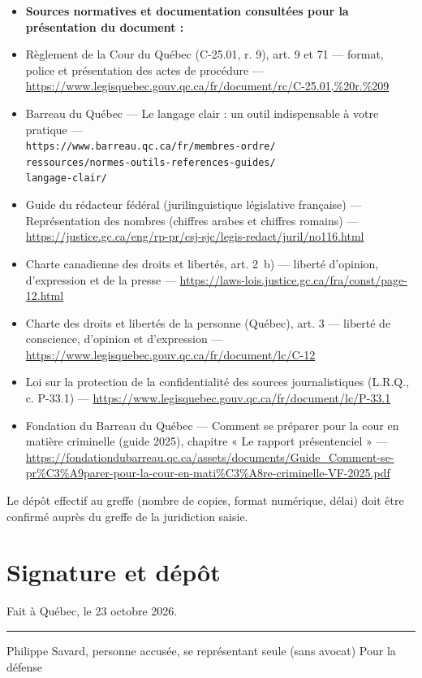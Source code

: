 \documentclass[12pt,letterpaper,oneside]{article}
\begin{document}
\begin{itemize}[leftmargin=*]
\item[] \textbf{Sources normatives et documentation consultées pour la présentation du document :}
\item Règlement de la Cour du Québec (C-25.01, r. 9), art. 9 et 71 — format, police et présentation des actes de procédure — \url{https://www.legisquebec.gouv.qc.ca/fr/document/rc/C-25.01,%20r.%209}
\item Barreau du Québec — Le langage clair : un outil indispensable à votre pratique —\\
\texttt{https://www.barreau.qc.ca/fr/membres-ordre/}\\\texttt{ressources/normes-outils-references-guides/}\\\texttt{langage-clair/}
\item Guide du rédacteur fédéral (jurilinguistique législative française) — Représentation des nombres (chiffres arabes et chiffres romains) — \url{https://justice.gc.ca/eng/rp-pr/csj-sjc/legis-redact/juril/no116.html}
\item Charte canadienne des droits et libertés, art. 2~b) — liberté d'opinion, d'expression et de la presse — \url{https://laws-lois.justice.gc.ca/fra/const/page-12.html}
\item Charte des droits et libertés de la personne (Québec), art. 3 — liberté de conscience, d'opinion et d'expression — \url{https://www.legisquebec.gouv.qc.ca/fr/document/lc/C-12}
\item Loi sur la protection de la confidentialité des sources journalistiques (L.R.Q., c. P-33.1) — \url{https://www.legisquebec.gouv.qc.ca/fr/document/lc/P-33.1}
\item Fondation du Barreau du Québec — Comment se préparer pour la cour en matière criminelle (guide 2025), chapitre « Le rapport présentenciel » — \url{https://fondationdubarreau.qc.ca/assets/documents/Guide_Comment-se-pr%C3%A9parer-pour-la-cour-en-mati%C3%A8re-criminelle-VF-2025.pdf}
\end{itemize}

Le dépôt effectif au greffe (nombre de copies, format numérique, délai) doit être confirmé auprès du greffe de la juridiction saisie.

\section{Signature et dépôt}
\vspace{1cm}
\begin{flushright}
Fait à Québec, le 23 octobre 2026.

\vspace{1.2cm}
\rule{6cm}{0.4pt}
Philippe Savard, personne accusée, se représentant seule (sans avocat)
Pour la défense
\end{flushright}
\end{document}

